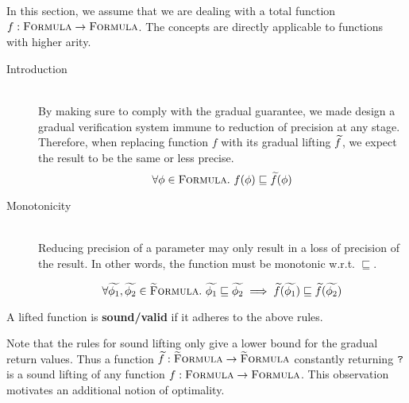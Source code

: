 
In this section, we assume that we are dealing with a total function $f : \textup{\textsc{Formula}} \rightarrow \textup{\textsc{Formula}}$.
The concepts are directly applicable to functions with higher arity.

\begin{description}
    \item[Introduction]~\\
    By making sure to comply with the gradual guarantee, we made design a gradual verification system immune to reduction of precision at any stage.
    Therefore, when replacing function $f$ with its gradual lifting $\widetilde{f}$, we expect the result to be the same or less precise.
    \begin{displaymath}
    \forall \phi \in \textup{\textsc{Formula}}.~ f(\phi) \sqsubseteq \widetilde{f}(\phi)
    \end{displaymath}
    
    \item[Monotonicity]~\\
    Reducing precision of a parameter may only result in a loss of precision of the result.
    In other words, the function must be monotonic w.r.t. $\sqsubseteq$.
    
    \begin{displaymath}
    \forall \widetilde{\phi_1}, \widetilde{\phi_2} \in \textup{\textsc{\ensuremath{\widetilde{\text{F}}}ormula}}.~ 
    \widetilde{\phi_1} \sqsubseteq \widetilde{\phi_2} 
    \implies 
    \widetilde{f}(\widetilde{\phi_1}) \sqsubseteq \widetilde{f}(\widetilde{\phi_2})
    \end{displaymath}
\end{description}

\begin{definition}
    A lifted function is \textbf{sound/valid} if it adheres to the above rules.
\end{definition}

Note that the rules for sound lifting only give a lower bound for the gradual return values.
Thus a function $\widetilde{f} : \textup{\textsc{\ensuremath{\widetilde{\text{F}}}ormula}} \rightarrow \textup{\textsc{\ensuremath{\widetilde{\text{F}}}ormula}}$ constantly returning $\textup{\texttt{?}}$ is a sound lifting of any function $f : \textup{\textsc{Formula}} \rightarrow \textup{\textsc{Formula}}$.
This observation motivates an additional notion of optimality.

